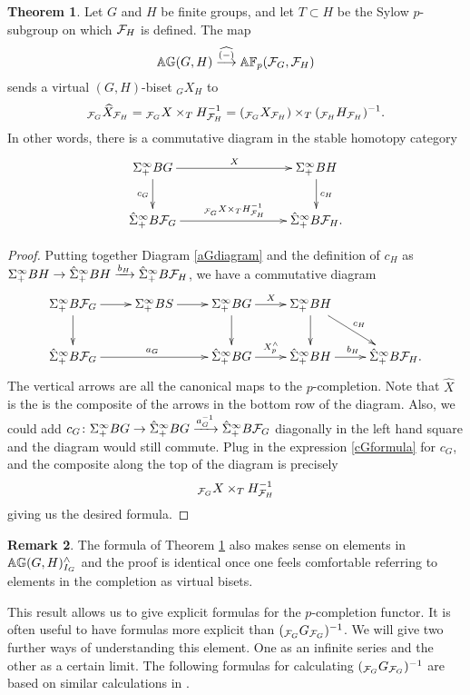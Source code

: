 \documentclass[10pt]{amsart}
\theoremstyle{definition}
\newtheorem{theorem}{Theorem}[section]
\newtheorem{remark}[theorem]{Remark}
\begin{document}


\begin{theorem} \label{mainthm}
Let $G$ and $H$ be finite groups, and let $T \subset H$ be the Sylow $p$-subgroup on which $\mathcal{F}_H$ is defined. The map
\[
\mathbb{A} \mathbb{G}(G,H) \overset{\widehat{(-)}}{\longrightarrow} \mathbb{A} \mathbb{F}_p(\mathcal{F}_G,\mathcal{F}_H)
\]
sends a virtual $(G,H)$-biset ${}_{G}X_{H}$ to
\[
{}_{\mathcal{F}_G}\widehat{X}_{\mathcal{F}_H} = {}_{\mathcal{F}_G}X \times_T H^{-1}_{\mathcal{F}_H} =  ({}_{\mathcal{F}_G}X_{\mathcal{F}_H}) \times_{T} ({}_{\mathcal{F}_H}H_{\mathcal{F}_H})^{-1}.
\]
In other words, there is a commutative diagram in the stable homotopy category
\[
\xymatrix{\Sinfp BG \ar[rrr]^X \ar[d]_{c_G} & & & \Sinfp BH \ar[d]^{c_H} \\ \Sinfpp B\cF_G \ar[rrr]^{{}_{\cF_G}X \times_T H^{-1}_{\cF_H}} & & & \Sinfpp B\cF_H.}
\]
\end{theorem}
\begin{proof}
Putting together Diagram \ref{aGdiagram} and the definition of $c_H$ as $\Sigma^{\infty}_{+} BH \to \hat{\Sigma}^{\infty}_{+} BH \xrightarrow{b_H} \hat{\Sigma}^{\infty}_{+} B\mathcal{F}_H$, we have a commutative diagram
\[
\xymatrix{\Sinfp B\cF_G \ar[r] \ar[d] & \Sinfp BS \ar[r] & \Sinfp BG \ar[d] \ar[r]^{X} & \Sinfp BH \ar[dr]^{c_H} \ar[d] & \\ \Sinfpp B\cF_G \ar[rr]^{a_G} && \Sinfpp BG \ar[r]^{X^{\wedge}_p} & \Sinfpp BH \ar[r]^{b_H} & \Sinfpp B\cF_H.}
\]
The vertical arrows are all the canonical maps to the $p$-completion. Note that $\widehat{X}$ is the is the composite of the arrows in the bottom row of the diagram. Also, we could add $c_G \colon \Sigma^{\infty}_{+} BG \to \hat{\Sigma}^{\infty}_{+} BG \xrightarrow{a_G^{-1}} \hat{\Sigma}^{\infty}_{+} B\mathcal{F}_G$ diagonally in the left hand square and the diagram would still commute. Plug in the expression \eqref{cGformula} for $c_G$, and the composite along the top of the diagram is precisely
\[
{}_{\mathcal{F}_G}X \times_T H^{-1}_{\mathcal{F}_H}
\]
giving us the desired formula.
\end{proof}

\begin{remark} The formula of Theorem \ref{mainthm} also makes sense on elements in $\mathbb{A} \mathbb{G}(G,H)^{\wedge}_{I_G}$ and the proof is identical once one feels comfortable referring to elements in the completion as virtual bisets.
\end{remark}

This result allows us to give explicit formulas for the $p$-completion functor. It is often useful to have formulas more explicit than $({}_{\mathcal{F}_G}G_{\mathcal{F}_G})^{-1}$. We will give two further ways of understanding this element. One as an infinite series and the other as a certain limit. The following formulas for calculating $({}_{\mathcal{F}_G}G_{\mathcal{F}_G})^{-1}$ are based on similar calculations in \cite{Ragnarsson}.
\end{document}
